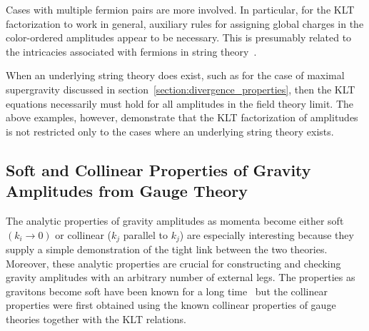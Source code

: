 Cases with multiple fermion pairs are more involved. In particular,
for the KLT factorization to work in general, auxiliary rules for
assigning global charges in the color-ordered amplitudes appear to be
necessary.  This is presumably related to the intricacies associated
with fermions in string theory~\cite{Friedan}.

When an underlying string theory does exist, such as for the case of
maximal supergravity discussed in
section~\ref{section:divergence_properties}, then the KLT equations
necessarily must hold for all amplitudes in the field theory limit.
The above examples, however, demonstrate that the KLT factorization of
amplitudes is not restricted only to the cases where an underlying string
theory exists.


\subsection{Soft and Collinear Properties of Gravity Amplitudes 
from Gauge Theory}
\label{subsection:soft_collinear}

The analytic properties of gravity amplitudes as momenta become either
soft $ (k_i \rightarrow 0)$ or collinear ($k_j$ parallel to $k_j$) are
especially interesting because they supply a simple demonstration of
the tight link between the two theories.  Moreover, these analytic
properties are crucial for constructing and checking gravity
amplitudes with an arbitrary number of external legs.  The properties
as gravitons become soft have been known for a long
time~\cite{WeinbergSoftG,BGK} but the collinear properties were first
obtained using the known collinear properties of gauge theories together
with the KLT relations.

